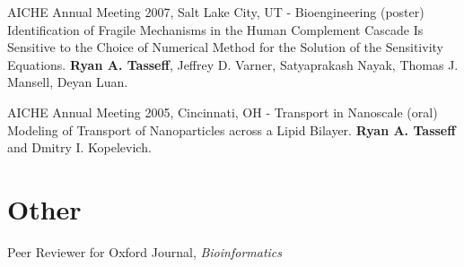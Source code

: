 \documentclass[margin,line]{res}
\begin{document}
\begin{resume}
AICHE Annual Meeting 2007, Salt Lake City, UT - Bioengineering (poster)\\
Identification of Fragile Mechanisms in the Human Complement Cascade Is Sensitive 
to the Choice of Numerical Method for the Solution of the Sensitivity Equations.
{\bf Ryan A. Tasseff}, Jeffrey D. Varner, Satyaprakash Nayak, Thomas J. Mansell, Deyan Luan.

AICHE Annual Meeting 2005, Cincinnati, OH - Transport in Nanoscale (oral)\\
Modeling of Transport of Nanoparticles across a Lipid Bilayer.
{\bf Ryan A. Tasseff} and Dmitry I. Kopelevich.


\section{\sc Other}
Peer Reviewer for Oxford Journal, {\it Bioinformatics}

\end{resume}
\end{document}
